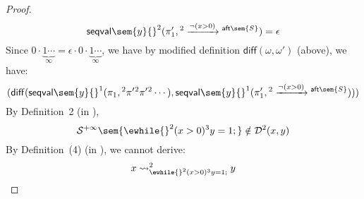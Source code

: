\begin{example}
\begin{proof}
\[ \]
 \[
  \mathsf{seqval}\sem{y}{}^2(\pi'_1, {}^2 \xrightarrow{\neg(x > 0)} {}^{\mathsf{aft}\sem{S}} ) = \epsilon
 \]
 Since $0 \cdot \underbrace{1 \cdots}_{\infty} = \epsilon \cdot 0 \cdot \underbrace{1 \cdots}_{\infty}$,
 we have by modified definition $\mathsf{diff}(\omega, \omega')$ (above), we have:
 \[
  (\mathsf{diff}(\mathsf{seqval}\sem{y}{}^1(\pi_1, {}^2 \pi' {}^2 \pi' {}^2 \cdots ), \mathsf{seqval}\sem{y}{}^1(\pi_1', {}^2 \xrightarrow{\neg(x > 0)} {}^{\mathsf{aft}\sem{S}} )))
 \]
  By Definition~2 (in \cite{cousot2019abstract}), 
 \[
  \mathcal{S}^{+\infty}\sem{\ewhile {}^2 (x > 0) {}^3 y = 1;} 
 \notin \mathcal{D}^2(x, y)
 \]
 By Definition~(4) (in \cite{cousot2019abstract}), we cannot derive:
 \[
  x \rightsquigarrow^{2}_{\ewhile {}^2 (x > 0) {}^3 y = 1;} y
 \]

 \end{proof}
 \end{example}
